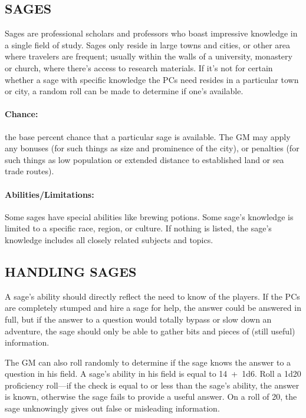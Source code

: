 \begin{multicols}{2}
\begin{minipage}{\columnwidth}
\end{minipage}

\subsection{SAGES}

Sages are professional scholars and professors who boast impressive knowledge in a single field of study.  Sages only reside in large towns and cities, or other area where travelers are frequent; usually within the walls of a university, monastery or church, where there's access to research materials.  If it's not for certain whether a sage with specific knowledge the PCs need resides in a particular town or city, a random roll can be made to determine if one's available.

\paragraph{Chance:} the base percent chance that a particular sage is available.  The GM may apply any bonuses (for such things as size and prominence of the city), or penalties (for such things as low population or extended distance to established land or sea trade routes).  

\paragraph{Abilities/Limitations:} Some sages have special abilities like brewing potions.  Some sage's knowledge is limited to a specific race, region, or culture.  If nothing is listed, the sage's knowledge includes all closely related subjects and topics.
 
\subsection{HANDLING SAGES}

A sage's ability should directly reflect the need to know of the players.  If the PCs are completely stumped and hire a sage for help, the answer could be answered in full, but if the answer to a question would totally bypass or slow down an adventure, the sage should only be able to gather bits and pieces of (still useful) information.  

The GM can also roll randomly to determine if the sage knows the answer to a question in his field.  A sage's ability in his field is equal to 14~+~1d6.  Roll a 1d20 proficiency roll---if the check is equal to or less than the sage's ability, the answer is known, otherwise the sage fails to provide a useful answer.  On a roll of 20, the sage unknowingly gives out false or misleading information.


\end{multicols}
